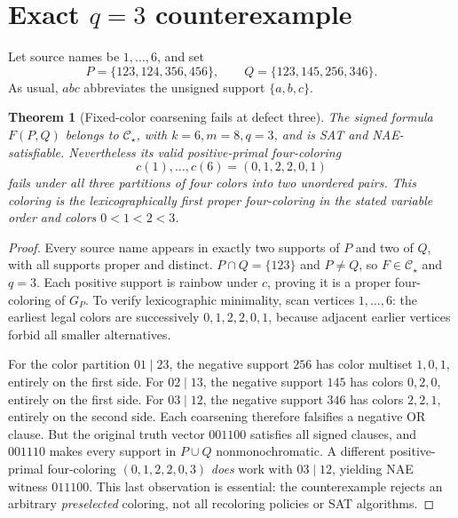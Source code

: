 \documentclass[11pt]{article}
\newtheorem{theorem}{Theorem}
\newcommand{\CS}{\mathcal C_{\star}}
\begin{document}
\section{Exact \(q=3\) counterexample}
Let source names be \(1,\ldots,6\), and set
\[
 P=\{123,124,356,456\},\qquad
 Q=\{123,145,256,346\}.
\]
As usual, \(abc\) abbreviates the unsigned support \(\{a,b,c\}\).
\begin{theorem}[Fixed-color coarsening fails at defect three]
The signed formula \(F(P,Q)\) belongs to \(\CS\), with \(k=6,m=8,q=3\), and is SAT and NAE-satisfiable. Nevertheless its valid positive-primal four-coloring
\[
 c(1),\ldots,c(6)=(0,1,2,2,0,1)
\]
fails under \emph{all three} partitions of four colors into two unordered pairs. This coloring is the lexicographically first proper four-coloring in the stated variable order and colors \(0<1<2<3\).
\end{theorem}
\begin{proof}
Every source name appears in exactly two supports of \(P\) and two of \(Q\), with all supports proper and distinct. \(P\cap Q=\{123\}\) and \(P\ne Q\), so \(F\in\CS\) and \(q=3\). Each positive support is rainbow under \(c\), proving it is a proper four-coloring of \(G_P\). To verify lexicographic minimality, scan vertices \(1,\ldots,6\): the earliest legal colors are successively \(0,1,2,2,0,1\), because adjacent earlier vertices forbid all smaller alternatives.

For the color partition \(01\mid23\), the negative support \(256\) has color multiset \(1,0,1\), entirely on the first side. For \(02\mid13\), the negative support \(145\) has colors \(0,2,0\), entirely on the first side. For \(03\mid12\), the negative support \(346\) has colors \(2,2,1\), entirely on the second side. Each coarsening therefore falsifies a negative OR clause. But the original truth vector \(001100\) satisfies all signed clauses, and \(001110\) makes every support in \(P\cup Q\) nonmonochromatic. A different positive-primal four-coloring \((0,1,2,2,0,3)\) \emph{does} work with \(03\mid12\), yielding NAE witness \(011100\). This last observation is essential: the counterexample rejects an arbitrary \emph{preselected} coloring, not all recoloring policies or SAT algorithms.
\end{proof}
\end{document}
